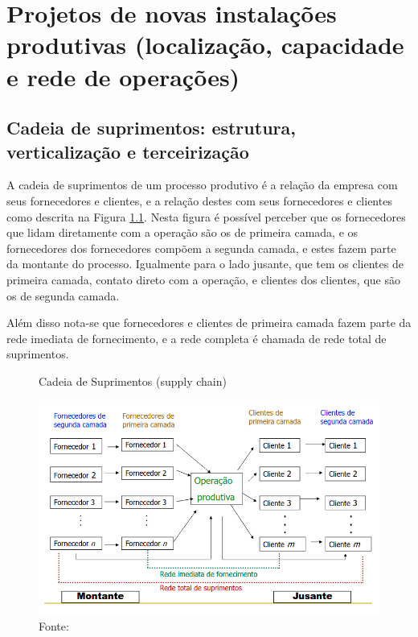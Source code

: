 \chapter{Projetos de novas instalações produtivas (localização, capacidade e rede de operações)}
\label{chap:projetos_de_novas}


\section{Cadeia de suprimentos: estrutura, verticalização e terceirização}
\label{sec:projetos_de_novas_supply_chain}
A cadeia de suprimentos de um processo produtivo é a relação da empresa com seus fornecedores e clientes, e a relação destes com seus fornecedores e clientes como descrita na Figura \ref{fig:supply_chain}. Nesta figura é possível perceber que os fornecedores que lidam diretamente com a operação são os de primeira camada, e os fornecedores dos fornecedores compõem a segunda camada, e estes fazem parte da montante do processo. Igualmente para o lado jusante, que tem os clientes de primeira camada, contato direto com a operação, e clientes dos clientes, que são os de segunda camada.
\par Além disso nota-se que fornecedores e clientes de primeira camada fazem parte da rede imediata de fornecimento, e a rede completa é chamada de rede total de suprimentos.


\begin{figure}[H]
    \centering
    \caption{Cadeia de Suprimentos (supply chain)}
    \includegraphics[width =\textwidth]{images/supply_chain.png}
    \caption*{Fonte: \cite{supplychain}}
    \label{fig:supply_chain}
\end{figure}

